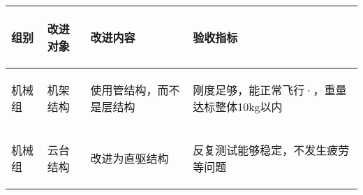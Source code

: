 
\begin{longtable}{ p{1.5cm} | p{3cm} | p{6cm} | p{4.3cm} |}

    \hline

    \endfoot
    
    \rowcolor{tabhdcolor}

        \begin{center}
            组别
        \end{center} &
        \begin{center}
            改进对象
        \end{center} &
        \begin{center}
            改进内容
        \end{center} &
        \begin{center}
            验收指标
        \end{center}\\

    \hline

    \endhead

        \begin{center}
            机械组
        \end{center} &
        \begin{center}
            机架结构
        \end{center} &
        \begin{center}
            使用管结构，而不是层结构
        \end{center} &
        \begin{center}
            刚度足够，能正常飞行·，重量达标整体10kg以内
        \end{center}\\
        
    \hline
        \begin{center}
            机械组
        \end{center}&
        \begin{center}
            云台结构
        \end{center}&
        \begin{center}
            改进为直驱结构
        \end{center}&
        \begin{center}
            反复测试能够稳定，不发生疲劳等问题
        \end{center}\\
        

\end{longtable}
